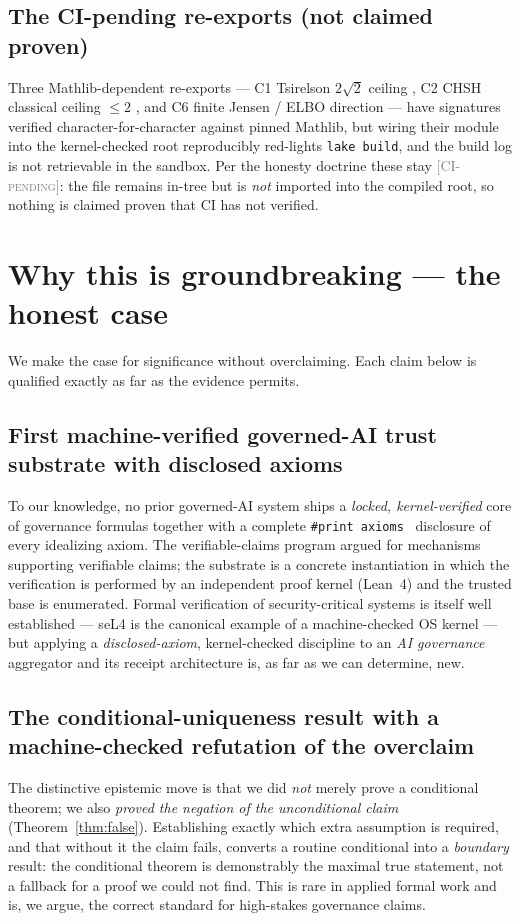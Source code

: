 \documentclass[11pt]{article}
\theoremstyle{plain}
\theoremstyle{definition}
\theoremstyle{remark}
\newcommand{\statusPending}{\textcolor{gray}{\textsc{[CI-pending]}}}
\newcommand{\printax}[1]{\texttt{\#print axioms}~\texttt{#1}}
\begin{document}
\subsection{The CI-pending re-exports (not claimed proven)}
Three Mathlib-dependent re-exports --- C1 Tsirelson $2\sqrt2$ ceiling
\cite{tsirelson1980}, C2 CHSH classical ceiling $\le 2$ \cite{chsh1969}, and C6
finite Jensen / ELBO direction \cite{jensen1906} --- have signatures verified
character-for-character against pinned Mathlib, but wiring their module into the
kernel-checked root reproducibly red-lights \texttt{lake build}, and the build log is
not retrievable in the sandbox. Per the honesty doctrine these stay
\statusPending: the file remains in-tree but is \emph{not} imported into the
compiled root, so nothing is claimed proven that CI has not verified.

\section{Why this is groundbreaking --- the honest case}
\label{sec:groundbreaking}

We make the case for significance without overclaiming. Each claim below is
qualified exactly as far as the evidence permits.

\subsection{First machine-verified governed-AI trust substrate with disclosed axioms}
To our knowledge, no prior governed-AI system ships a \emph{locked,
kernel-verified} core of governance formulas together with a complete \printax{}
disclosure of every idealizing axiom. The verifiable-claims program
\cite{brundage2020} argued for mechanisms supporting verifiable claims; the
substrate is a concrete instantiation in which the verification is performed by an
independent proof kernel (Lean~4) and the trusted base is enumerated. Formal
verification of security-critical systems is itself well established --- seL4 is the
canonical example of a machine-checked OS kernel --- but applying a
\emph{disclosed-axiom}, kernel-checked discipline to an \emph{AI governance}
aggregator and its receipt architecture is, as far as we can determine, new.

\subsection{The conditional-uniqueness result with a machine-checked refutation of the overclaim}
The distinctive epistemic move is that we did \emph{not} merely prove a conditional
theorem; we also \emph{proved the negation of the unconditional claim}
(Theorem~\ref{thm:false}). Establishing exactly which extra assumption is required,
and that without it the claim fails, converts a routine conditional into a
\emph{boundary} result: the conditional theorem is demonstrably the maximal true
statement, not a fallback for a proof we could not find. This is rare in applied
formal work and is, we argue, the correct standard for high-stakes governance
claims.
\end{document}
